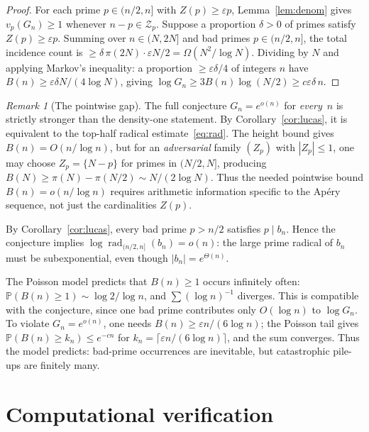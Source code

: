\documentclass[11pt]{article}
\theoremstyle{definition}
\theoremstyle{remark}
\newtheorem{remark}[theorem]{Remark}
\begin{document}
\begin{proof}
For each prime $p \in (n/2, n]$ with $Z(p) \ge \varepsilon p$,
Lemma~\ref{lem:denom} gives $v_p(G_n) \ge 1$ whenever
$n - p \in \mathcal{Z}_p$.
Suppose a proportion $\delta > 0$ of primes satisfy
$Z(p) \ge \varepsilon p$.
Summing over $n \in (N, 2N]$ and bad primes
$p \in (n/2, n]$, the total incidence count is
$\ge \delta\,\pi(2N) \cdot \varepsilon N / 2 = \Omega(N^2/\log N)$.
Dividing by $N$ and applying Markov's inequality:
a proportion $\ge \varepsilon\delta/4$ of integers $n$
have $B(n) \ge \varepsilon\delta N/(4\log N)$,
giving $\log G_n \ge 3B(n)\log(N/2) \ge c\varepsilon\delta\,n$.
\end{proof}

\begin{remark}[The pointwise gap]\label{rem:pointwise-gap}
The full conjecture $G_n = e^{o(n)}$ for \emph{every}~$n$
is strictly stronger than the density-one statement.
By Corollary~\ref{cor:lucas}, it is equivalent to
the top-half radical estimate~\eqref{eq:rad}.
The height bound gives
$B(n) = O(n/\log n)$, but for an \emph{adversarial}
family $(Z_p)$ with $|Z_p| \le 1$, one may
choose $Z_p = \{N - p\}$ for primes in $(N/2, N]$,
producing $B(N) \ge \pi(N) - \pi(N/2) \sim N/(2\log N)$.
Thus the needed pointwise bound $B(n) = o(n/\log n)$
requires arithmetic information specific to the
Ap\'ery sequence, not just the cardinalities $Z(p)$.

By Corollary~\ref{cor:lucas},
every bad prime $p > n/2$ satisfies
$p \mid b_n$. Hence the conjecture implies
$\log\operatorname{rad}_{(n/2,n]}(b_n) = o(n)$:
the large prime radical of $b_n$ must be
subexponential, even though $|b_n| = e^{\Theta(n)}$.

The Poisson model predicts that
$B(n) \ge 1$ occurs infinitely often:
$\mathbb{P}(B(n) \ge 1) \sim \log 2/\!\log n$,
and $\sum (\log n)^{-1}$ diverges.
This is compatible with the conjecture,
since one bad prime contributes only
$O(\log n)$ to $\log G_n$.
To violate $G_n = e^{o(n)}$,
one needs $B(n) \ge \varepsilon n/(6\log n)$;
the Poisson tail gives
$\mathbb{P}(B(n) \ge k_n) \le e^{-cn}$
for $k_n = \lceil \varepsilon n/(6\log n) \rceil$,
and the sum converges.
Thus the model predicts: bad-prime occurrences
are inevitable, but catastrophic pile-ups
are finitely many.
\end{remark}

\section{Computational verification}\label{sec:comp}
\end{document}
